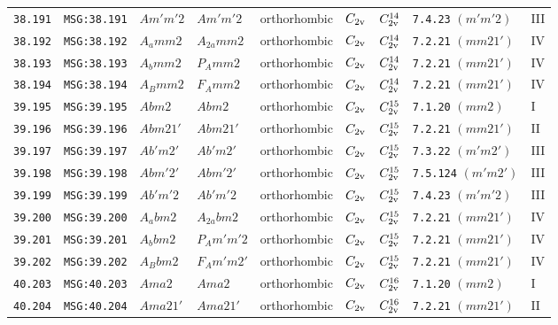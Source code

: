 \documentclass[fleqn,10pt]{jsarticle}
\begin{document}
\begin{center}
\begin{longtable}{lllllllll}
\texttt{38.191} & \texttt{MSG:38.191} & $Am'm'2$ & $Am'm'2$ & orthorhombic & $C_{\rm 2v}$ & $C_{\rm 2v}^{14}$ & \texttt{7.4.23} $(m'm'2)$ & III \\
\texttt{38.192} & \texttt{MSG:38.192} & $A_{a}mm2$ & $A_{2a}mm2$ & orthorhombic & $C_{\rm 2v}$ & $C_{\rm 2v}^{14}$ & \texttt{7.2.21} $(mm21')$ & IV \\
\texttt{38.193} & \texttt{MSG:38.193} & $A_{b}mm2$ & $P_{A}mm2$ & orthorhombic & $C_{\rm 2v}$ & $C_{\rm 2v}^{14}$ & \texttt{7.2.21} $(mm21')$ & IV \\
\texttt{38.194} & \texttt{MSG:38.194} & $A_{B}mm2$ & $F_{A}mm2$ & orthorhombic & $C_{\rm 2v}$ & $C_{\rm 2v}^{14}$ & \texttt{7.2.21} $(mm21')$ & IV \\ \hline
\texttt{39.195} & \texttt{MSG:39.195} & $Abm2$ & $Abm2$ & orthorhombic & $C_{\rm 2v}$ & $C_{\rm 2v}^{15}$ & \texttt{7.1.20} $(mm2)$ & I \\
\texttt{39.196} & \texttt{MSG:39.196} & $Abm21'$ & $Abm21'$ & orthorhombic & $C_{\rm 2v}$ & $C_{\rm 2v}^{15}$ & \texttt{7.2.21} $(mm21')$ & II \\
\texttt{39.197} & \texttt{MSG:39.197} & $Ab'm2'$ & $Ab'm2'$ & orthorhombic & $C_{\rm 2v}$ & $C_{\rm 2v}^{15}$ & \texttt{7.3.22} $(m'm2')$ & III \\
\texttt{39.198} & \texttt{MSG:39.198} & $Abm'2'$ & $Abm'2'$ & orthorhombic & $C_{\rm 2v}$ & $C_{\rm 2v}^{15}$ & \texttt{7.5.124} $(m'm2')$ & III \\
\texttt{39.199} & \texttt{MSG:39.199} & $Ab'm'2$ & $Ab'm'2$ & orthorhombic & $C_{\rm 2v}$ & $C_{\rm 2v}^{15}$ & \texttt{7.4.23} $(m'm'2)$ & III \\
\texttt{39.200} & \texttt{MSG:39.200} & $A_{a}bm2$ & $A_{2a}bm2$ & orthorhombic & $C_{\rm 2v}$ & $C_{\rm 2v}^{15}$ & \texttt{7.2.21} $(mm21')$ & IV \\
\texttt{39.201} & \texttt{MSG:39.201} & $A_{b}bm2$ & $P_{A}m'm'2$ & orthorhombic & $C_{\rm 2v}$ & $C_{\rm 2v}^{15}$ & \texttt{7.2.21} $(mm21')$ & IV \\
\texttt{39.202} & \texttt{MSG:39.202} & $A_{B}bm2$ & $F_{A}m'm2'$ & orthorhombic & $C_{\rm 2v}$ & $C_{\rm 2v}^{15}$ & \texttt{7.2.21} $(mm21')$ & IV \\ \hline
\texttt{40.203} & \texttt{MSG:40.203} & $Ama2$ & $Ama2$ & orthorhombic & $C_{\rm 2v}$ & $C_{\rm 2v}^{16}$ & \texttt{7.1.20} $(mm2)$ & I \\
\texttt{40.204} & \texttt{MSG:40.204} & $Ama21'$ & $Ama21'$ & orthorhombic & $C_{\rm 2v}$ & $C_{\rm 2v}^{16}$ & \texttt{7.2.21} $(mm21')$ & II \\

\end{longtable}
\end{center}
\end{document}
